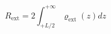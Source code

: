\documentclass[12pt, a4paper]{article}
\begin{document}
\begin{equation}
R_{\text{ext}} =2\int_{+L/2}^{+\infty}\varrho_{\text{ext}}(z)dz
    \label{R_ext}
\end{equation}




\end{document}
